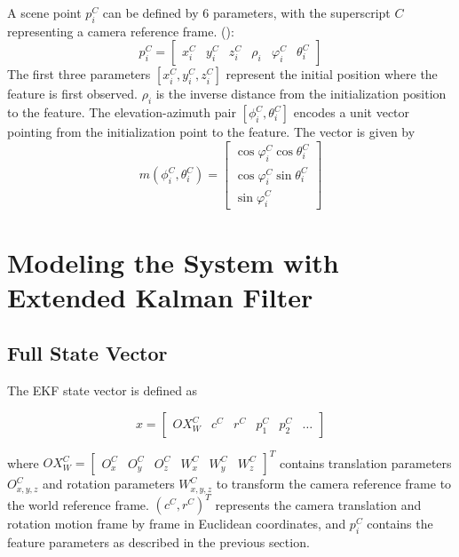 A scene point $p_{i}^{C}$ can be defined by 6 parameters, with the 
superscript $C$ representing a camera reference frame. ():
\begin{equation}
p_{i}^{C}=\begin{bmatrix}
x_{i}^{C} & y_{i}^{C} & z_{i}^{C} & \rho _{i} & \varphi _{i}^{C} & 
\theta _{i}^{C} 
\end{bmatrix}
\end{equation}
The first three parameters $[x_{i}^{C}, y_{i}^{C}, z_{i}^{C}]$ 
represent the initial position where the feature is first observed. $\rho _{i}$ is the inverse distance from the initialization position to 
the feature. The elevation-azimuth pair $[\phi_{i}^{C}, \theta_{i}^{C}]$ encodes a unit vector pointing from the initialization point 
to the feature. The vector is given by
\begin{equation}
m(\phi_{i}^{C}, \theta_{i}^{C})=\begin{bmatrix}
\cos\varphi_{i}^{C}\cos\theta _{i}^{C} \\
\cos\varphi_{i}^{C}\sin\theta _{i}^{C} \\
\sin\varphi_{i}^{C}
\end{bmatrix}
\end{equation}

\section{Modeling the System with Extended Kalman 
Filter}

\subsection{Full State Vector}

The EKF state vector is defined as 

\begin{equation}
x=\begin{bmatrix}
OX_{W}^{C} & c^{C} & r^{C} & p_{1}^{C} & p_{2}^{C} & \ldots 
\end{bmatrix}
\end{equation}

\noindent where $OX_{W}^{C}= \begin{bmatrix}O_{x}^{C} & O_{y}^{C} &
  O_{z}^{C} & W_{x}^{C} & W_{y}^{C} & W_{z}^{C} \end{bmatrix}^{T}$
contains translation parameters $O_{x,y,z}^{C}$ and rotation
parameters $W_{x,y,z}^{C}$ to transform the camera reference frame to
the world reference frame. $\left(c^{C},r^{C}\right)^{T}$ represents
the camera translation and rotation motion frame by frame in Euclidean
coordinates, and $p_{i}^{C}$ contains the feature parameters as
described in the previous section.

